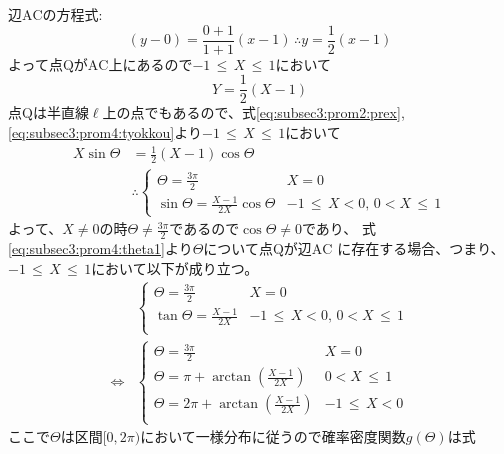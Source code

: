 \begin{enumerate}[(1)]
    辺$\mathrm{AC}$の方程式:
    \begin{equation*}
        (y - 0) = \frac{0 + 1}{1 + 1}(x - 1)\, \therefore y = \frac{1}{2}(x - 1)
    \end{equation*}
    よって点$\mathrm{Q}$が$\mathrm{AC}$上にあるので$-1\, \leq\,  X\, \leq \, 1$において
    \begin{equation}
        Y = \frac{1}{2}(X - 1)\label{eq:subsec3:prom4:tyokkou}
    \end{equation}
    点$\mathrm{Q}$は半直線$\ell$上の点でもあるので、式\eqref{eq:subsec3:prom2:prex}, 
    \eqref{eq:subsec3:prom4:tyokkou}より$-1\, \leq\,  X\, \leq \, 1$において
    \begin{align}
        X\sin\Theta &= \frac{1}{2}\left(X - 1\right)\cos\Theta\nonumber\\
        &\therefore
        \begin{cases}
            \Theta = \frac{3\pi}{2} & X = 0\\
            \sin\Theta = \frac{X - 1}{2X}\cos\Theta & -1\, \leq\, X < 0,\, 0 < X\, \leq\, 1
        \end{cases}\label{eq:subsec3:prom4:theta1}
    \end{align}
    よって、$X \neq 0$の時$\Theta \neq \frac{3\pi}{2}$であるので$\cos\Theta \neq 0$であり、
    式\eqref{eq:subsec3:prom4:theta1}より$\Theta$について点$\mathrm{Q}$が辺$\mathrm{AC}$
    に存在する場合、つまり、$-1\, \leq\, X\, \leq\, 1$において以下が成り立つ。
    \begin{align}
        &\begin{cases}
            \Theta = \frac{3\pi}{2} & X = 0\\
            \tan\Theta = \frac{X - 1}{2X} & -1\, \leq\, X < 0,\, 0 < X\, \leq\, 1\\
        \end{cases}\nonumber\\
        \Longleftrightarrow&
        \begin{cases}
            \Theta = \frac{3\pi}{2} & X = 0\\
            \Theta = \pi + \arctan\left(\frac{X - 1}{2X}\right) & 0 < X \, \leq\, 1\\
            \Theta = 2\pi + \arctan\left(\frac{X - 1}{2X}\right) & -1\, \leq\, X < 0\\
        \end{cases}\label{eq:subsec3:prom4:theta2}
    \end{align}
    ここで$\Theta$は区間$[0, 2\pi)$において一様分布に従うので確率密度関数$g(\Theta)$は式

\end{enumerate}
